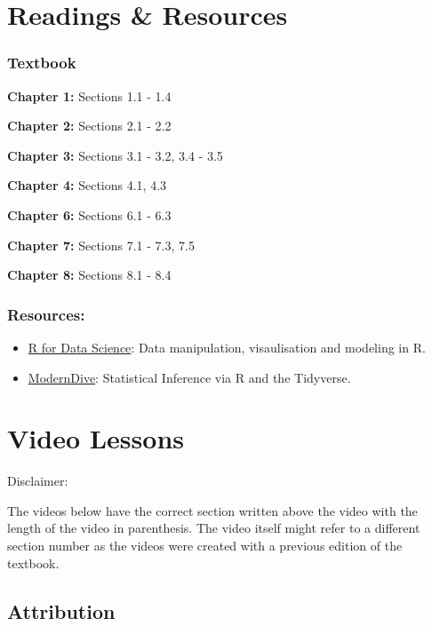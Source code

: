 \documentclass[
]{book}
\providecommand{\tightlist}{%
  \setlength{\itemsep}{0pt}\setlength{\parskip}{0pt}}
\begin{document}
\hypertarget{rr}{%
\chapter{Readings \& Resources}\label{rr}}

\hypertarget{textbook}{%
\subsection{Textbook}\label{textbook}}

\textbf{Chapter 1:} Sections 1.1 - 1.4

\textbf{Chapter 2:} Sections 2.1 - 2.2

\textbf{Chapter 3:} Sections 3.1 - 3.2, 3.4 - 3.5

\textbf{Chapter 4:} Sections 4.1, 4.3

\textbf{Chapter 6:} Sections 6.1 - 6.3

\textbf{Chapter 7:} Sections 7.1 - 7.3, 7.5

\textbf{Chapter 8:} Sections 8.1 - 8.4

\hypertarget{resources}{%
\subsection{Resources:}\label{resources}}

\begin{itemize}
\tightlist
\item
  \href{https://r4ds.had.co.nz/}{R for Data Science}: Data manipulation, visaulisation and modeling in R.
\item
  \href{https://moderndive.com/}{ModernDive}: Statistical Inference via R and the Tidyverse.
\end{itemize}

\hypertarget{vids}{%
\chapter{Video Lessons}\label{vids}}

Disclaimer:~

The videos below have the correct section written above the video with the length of the video in parenthesis. The video itself might refer to a different section number as the videos were created with a previous edition of the textbook.

\hypertarget{attribution}{%
\section{Attribution}\label{attribution}}
\end{document}
